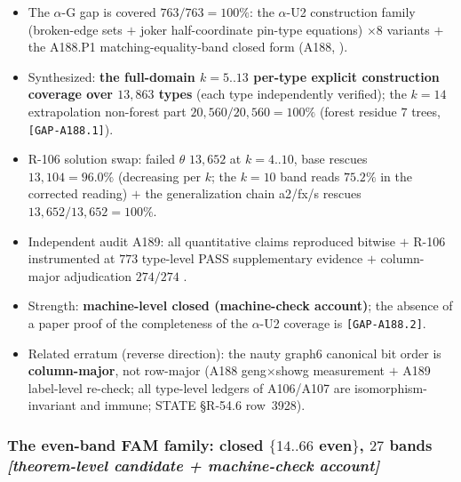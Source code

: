 \begin{itemize}
\item The $\alpha$-G gap is covered $763/763=100\%$: the $\alpha$-U2
construction family (broken-edge sets $+$ joker half-coordinate pin-type
equations) $\times8$ variants $+$ the A188.P1 matching-equality-band closed
form (A188, ).
\item Synthesized: \textbf{the full-domain $k=5..13$ per-type explicit
construction coverage over $13{,}863$ types} (each type independently
verified); the $k=14$ extrapolation non-forest part
$20{,}560/20{,}560=100\%$ (forest residue $7$ trees,
\texttt{[GAP-A188.1]}).
\item R-106 solution swap: failed $\theta$ $13{,}652$ at $k=4..10$, base
rescues $13{,}104=96.0\%$ (decreasing per $k$; the $k=10$ band reads
$75.2\%$ in the corrected reading) $+$ the generalization chain
a2/fx/s rescues $13{,}652/13{,}652=100\%$.
\item Independent audit A189: all quantitative claims reproduced bitwise
$+$ R-106 instrumented at $773$ type-level PASS supplementary evidence
$+$ column-major adjudication $274/274$ .
\item Strength: \textbf{machine-level closed (machine-check account)}; the
absence of a paper proof of the completeness of the $\alpha$-U2 coverage is
\texttt{[GAP-A188.2]}\openlab.
\item Related erratum (reverse direction): the nauty graph6 canonical bit
order is \textbf{column-major}, not row-major (A188 geng$\times$showg
measurement $+$ A189 label-level re-check; all type-level ledgers of
A106/A107 are isomorphism-invariant and immune; STATE \S R-54.6 row~3928).
\end{itemize}

\subsubsection{The even-band FAM family: closed $\{14..66$ even$\}$, $27$
bands \emph{[theorem-level candidate + machine-check
account]}}\label{subsubsec:add-evenband}

